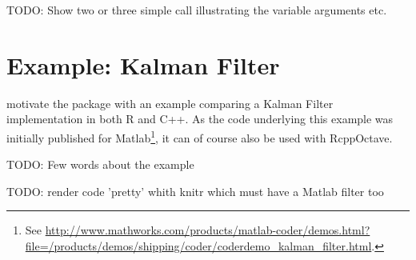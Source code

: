 TODO: Show two or three simple call illustrating the variable arguments etc.

\section{Example: Kalman Filter}

\cite{Eddelbuettel+Sanderson:2012} motivate the  package
with an example comparing a Kalman Filter implementation in both R and
C++. As the code underlying this example was initially published for
Matlab\footnote{See
  \url{http://www.mathworks.com/products/matlab-coder/demos.html?file=/products/demos/shipping/coder/coderdemo_kalman_filter.html}.},
it can of course also be used with RcppOctave.

TODO: Few words about the example

TODO: render code 'pretty' whith knitr which must have a Matlab filter too

